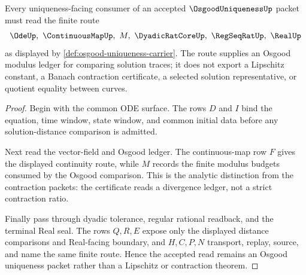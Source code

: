 \begin{theorem}
\label{thm:osgood-uniqueness-non-lipschitz-route}
Every uniqueness-facing consumer of an accepted $\OsgoodUniquenessUp$ packet must read the finite route
$$
\OdeUp,\ \ContinuousMapUp,\ M,\ \DyadicRatCoreUp,\ \RegSeqRatUp,\ \RealUp
$$
as displayed by \autoref{def:osgood-uniqueness-carrier}. The route supplies an Osgood modulus ledger for comparing solution traces; it does not export a Lipschitz constant, a Banach contraction certificate, a selected solution representative, or quotient equality between curves.
\end{theorem}
\begin{proof}
Begin with the common ODE surface. The rows $D$ and $I$ bind the equation, time window, state window, and common initial data before any solution-distance comparison is admitted.

Next read the vector-field and Osgood ledger. The continuous-map row $F$ gives the displayed continuity route, while $M$ records the finite modulus budgets consumed by the Osgood comparison. This is the analytic distinction from the contraction packets: the certificate reads a divergence ledger, not a strict contraction ratio.

Finally pass through dyadic tolerance, regular rational readback, and the terminal Real seal. The rows $Q,R,E$ expose only the displayed distance comparisons and Real-facing boundary, and $H,C,P,N$ transport, replay, source, and name the same finite route. Hence the accepted read remains an Osgood uniqueness packet rather than a Lipschitz or contraction theorem.
\end{proof}




